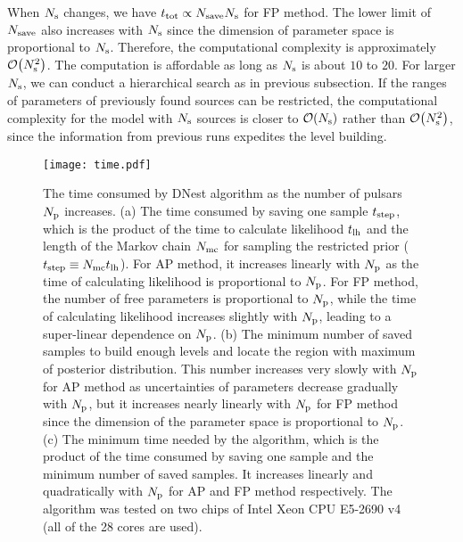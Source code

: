 \documentclass[times,tight]{aastex631}
\begin{document}
When $N_{\rm s}$ changes, we have $t_{\rm tot} \propto N_{\rm save} N_{\rm s}$ for FP method.
The lower limit of $N_{\rm save}$ also increases with $N_{\rm s}$ since the dimension of parameter space is proportional to $N_{\rm s}$.
Therefore, the computational complexity is approximately $\order{N_{\rm s}^2}$.
The computation is affordable as long as $N_{\rm s}$ is about $10$ to $20$.
For larger $N_{\rm s}$, we can conduct a hierarchical search as in previous subsection.
If the ranges of parameters of previously found sources can be restricted, the computational complexity for the model with $N_{\rm s}$ sources is closer to $\order{N_{\rm s}}$ rather than $\order{N_{\rm s}^2}$, since the information from previous runs expedites the level building.

\begin{figure}
    \centering
    \texttt{[image: time.pdf]}
    \caption{The time consumed by DNest algorithm as the number of pulsars $N_{\rm p}$ increases. 
    (a) The time consumed by saving one sample $t_{\rm step}$, which is the product of the time to calculate likelihood $t_{\rm lh}$ and the length of the Markov chain $N_{\rm mc}$ for sampling the restricted prior ($t_{\rm step} \equiv N_{\rm mc} t_{\rm lh}$).
    For AP method, it increases linearly with $N_{\rm p}$ as the time of calculating likelihood is proportional to $N_{\rm p}$. 
    For FP method, the number of free parameters is proportional to $N_{\rm p}$, while the time of calculating likelihood increases slightly with $N_{\rm p}$, leading to a super-linear dependence on $N_{\rm p}$.
    (b) The minimum number of saved samples to build enough levels and locate the region with maximum of posterior distribution.
    This number increases very slowly with $N_{\rm p}$ for AP method as uncertainties of parameters decrease gradually with $N_{\rm p}$, but it increases nearly linearly with $N_{\rm p}$ for FP method since the dimension of the parameter space is proportional to $N_{\rm p}$.
    (c) The minimum time needed by the algorithm, which is the product of the time consumed by saving one sample and the minimum number of saved samples.
    It increases linearly and quadratically with $N_{\rm p}$ for AP and FP method respectively.
    The algorithm was tested on two chips of Intel Xeon CPU E5-2690 v4 (all of the 28 cores are used).
    \label{fig:time}}
\end{figure}
\end{document}
